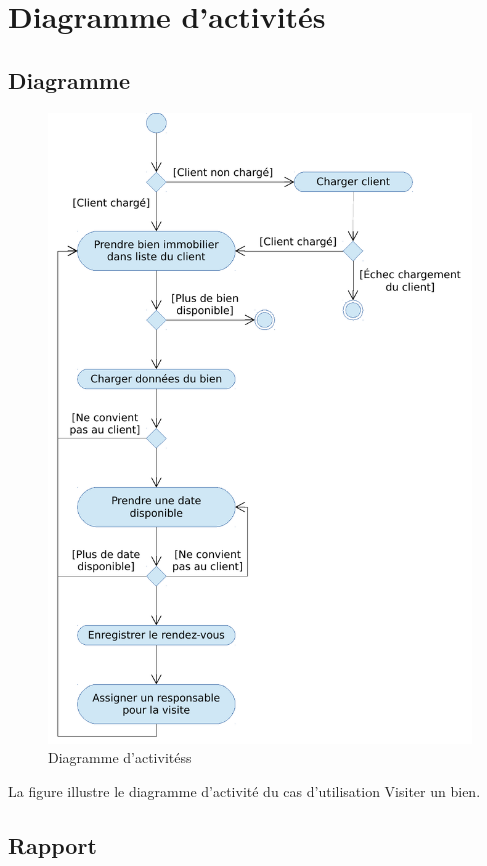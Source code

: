 \chapter{Diagramme d'activités}

\section{Diagramme}

\begin{figure}
  \centering
  \includegraphics[scale=0.67]{IMG/ad}
  \caption{Diagramme d'activitéss}
  \label{img_ad}
\end{figure}

La figure  illustre le diagramme d'activité du cas d'utilisation \og{}Visiter un bien\fg{}.

\section{Rapport}


